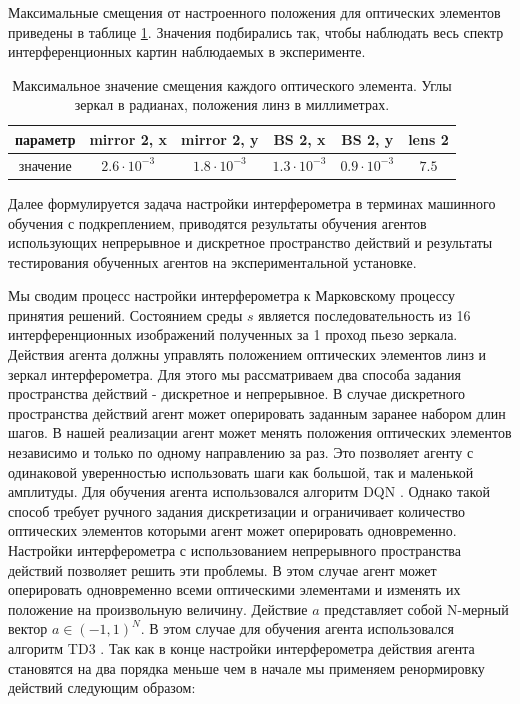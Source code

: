 Максимальные смещения от настроенного положения для оптических элементов приведены в таблице \ref{tab:interf_dyn_params}. Значения подбирались так, чтобы наблюдать весь спектр интерференционных картин наблюдаемых в эксперименте.

\begin{table} [htbp]
    \centering
    \begin{threeparttable}%
        \caption{Максимальное значение смещения каждого оптического элемента. Углы зеркал в радианах, положения линз в миллиметрах.}
        \begin{tabular}{|c|c|c|c|c|c|}
            \hline
            \hline
            параметр & mirror 2, x & mirror 2, y & BS 2, x & BS 2, y & lens 2 \\
            \hline
            значение & $2.6 \cdot 10^{-3}$ & $1.8 \cdot 10^{-3}$ & $1.3 \cdot 10^{-3}$ & $0.9 \cdot 10^{-3}$ & $7.5$ \\
            \hline
            \hline
        \end{tabular}
        \label{tab:interf_dyn_params}
    \end{threeparttable}
\end{table}


Далее формулируется задача настройки интерферометра в терминах машинного обучения с подкреплением, приводятся результаты обучения агентов использующих непрерывное и дискретное пространство действий и результаты тестирования обученных агентов на экспериментальной установке. 

Мы сводим процесс настройки интерферометра к Марковскому процессу принятия решений. Состоянием среды $s$ является последовательность из 16 интерференционных изображений полученных за 1 проход пьезо зеркала. Действия агента должны управлять положением оптических элементов линз и зеркал интерферометра. Для этого мы рассматриваем два способа задания пространства действий - дискретное и непрерывное. В случае дискретного пространства действий агент может оперировать заданным заранее набором длин шагов. В нашей реализации агент может менять положения оптических элементов независимо и только по одному направлению за раз. Это позволяет агенту с одинаковой уверенностью использовать шаги как большой, так и маленькой амплитуды. Для обучения агента использовался алгоритм DQN \cite{dqn}.  Однако такой способ требует ручного задания дискретизации и ограничивает количество оптических элементов которыми агент может оперировать одновременно. Настройки интерферометра с использованием непрерывного пространства действий позволяет решить эти проблемы. В этом случае агент может оперировать одновременно всеми оптическими элементами и изменять их положение на произвольную величину. Действие $a$ представляет собой N-мерный вектор $a \in (-1, 1)^{N}$. 
В этом случае для обучения агента использовался алгоритм TD3 \cite{ddpg}.
Так как в конце настройки интерферометра действия агента становятся на два порядка меньше чем в начале мы применяем ренормировку действий следующим образом: 

